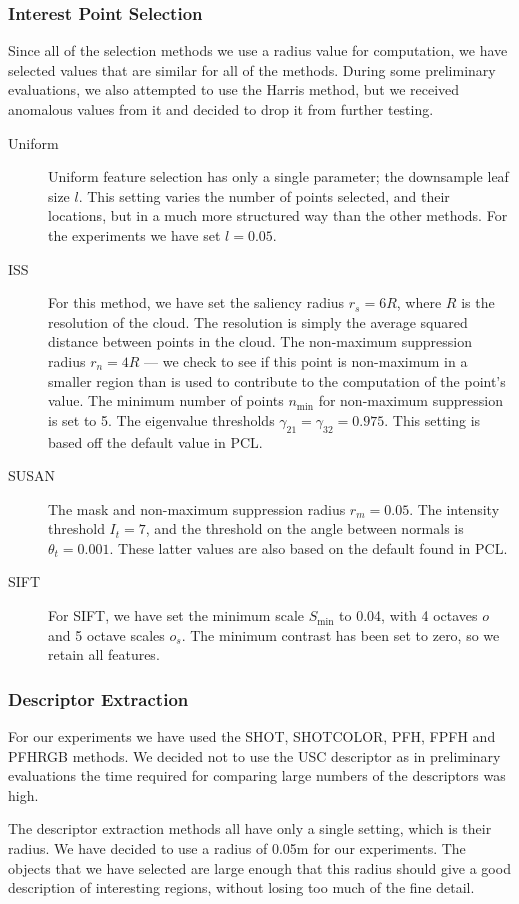\documentclass[11pt,a4paper]{kth-mag}
\begin{document}
\subsubsection{Interest Point Selection}
Since all of the selection methods we use a radius value for computation, we
have selected values that are similar for all of the methods. During some
preliminary evaluations, we also attempted to use the Harris method, but we
received anomalous values from it and decided to drop it from further testing.
\begin{description}
\item[Uniform] Uniform feature selection has only a single parameter; the
  downsample leaf size $l$. This setting varies the number of points selected,
  and their locations, but in a much more structured way than the other methods.
  For the experiments we have set $l=0.05$.
\item[ISS] For this method, we have set the saliency radius $r_s=6R$, where $R$
  is the resolution of the cloud. The resolution is simply the average squared
  distance between points in the cloud. The non-maximum suppression radius
  $r_n=4R$ --- we check to see if this point is non-maximum in a smaller
  region than is used to contribute to the computation of the point's value. The
  minimum number of points $n_{\min}$ for non-maximum suppression is set to 5.
  The eigenvalue thresholds $\gamma_{21}=\gamma_{32}=0.975$. This setting is
  based off the default value in PCL.
\item[SUSAN] The mask and non-maximum suppression radius $r_m=0.05$. The
  intensity threshold $I_t=7$, and the threshold on the angle between normals is
  $\theta_t=0.001$. These latter values are also based on the default found in
  PCL.
\item[SIFT] For SIFT, we have set the minimum scale $S_{\min}$ to 0.04, with 4
  octaves $o$ and 5 octave scales $o_s$. The minimum contrast has been set to
  zero, so we retain all features.
\end{description}

\subsubsection{Descriptor Extraction}
For our experiments we have used the SHOT, SHOTCOLOR, PFH, FPFH and PFHRGB
methods. We decided not to use the USC descriptor as in preliminary evaluations
the time required for comparing large numbers of the descriptors was high.

The descriptor extraction methods all have only a single setting, which is their
radius. We have decided to use a radius of 0.05m for our experiments. The
objects that we have selected are large enough that this radius should give a
good description of interesting regions, without losing too much of the fine
detail.
\end{document}
